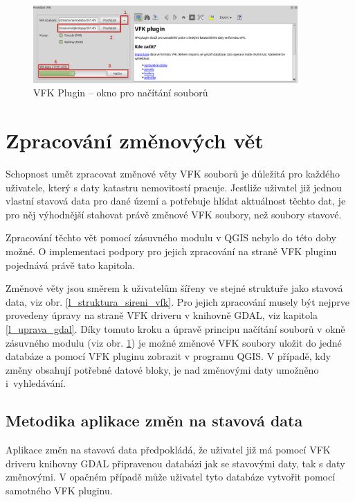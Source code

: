 \documentclass[a4paper,12pt,oneside]{book}
\begin{document}
\begin{figure}[htb]
\centering
\includegraphics[width=0.9\textwidth]{images/vfkPlugin-novy_vzhled.png}
\caption[VFK Plugin -- okno pro načítání souborů]{VFK Plugin -- okno pro načítání souborů}
\label{l_plugin_novy_vzhled}
\end{figure}


\clearpage
\section{Zpracování změnových vět}
\label{l_zpracovani_zmen}
Schopnost umět zpracovat změnové věty VFK souborů je důležitá pro každého uživatele, který s daty katastru nemovitostí pracuje. Jestliže uživatel již jednou vlastní stavová data pro dané území a potřebuje hlídat aktuálnost těchto dat, je pro něj výhodnější stahovat právě změnové VFK soubory, než soubory stavové. 

Zpracování těchto vět pomocí zásuvného modulu v QGIS nebylo do této doby možné. O implementaci podpory pro jejich zpracování na straně VFK pluginu pojednává právě tato kapitola.

Změnové věty jsou směrem k uživatelům šířeny ve stejné struktuře jako stavová data, viz obr. \ref{l_struktura_sireni_vfk}. Pro jejich zpracování musely být nejprve provedeny úpravy na straně VFK driveru v knihovně GDAL, viz kapitola \ref{l_uprava_gdal}. Díky tomuto kroku a úpravě principu načítání souborů v okně zásuvného modulu (viz obr. \ref{l_plugin_novy_vzhled}) je možné změnové VFK soubory uložit do jedné databáze a pomocí VFK pluginu zobrazit v programu QGIS. V případě, kdy změny obsahují potřebné datové bloky, je nad změnovými daty umožněno i~vyhledávání.

\subsection{Metodika aplikace změn na stavová data}
Aplikace změn na stavová data předpokládá, že uživatel již má pomocí VFK driveru knihovny GDAL připravenou databázi jak se stavovými daty, tak s daty změnovými. V opačném případě může uživatel tyto databáze vytvořit pomocí samotného VFK pluginu. 
\end{document}

